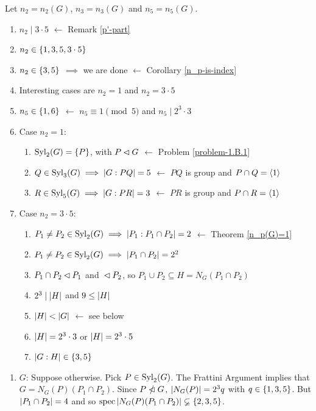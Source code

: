 \begin{solution} Let $n_2=n_2(G)$, $n_3=n_3(G)$ and $n_5=n_5(G)$. 
\begin{enumerate}[1.]
    \item $n_2\mid3\cdot5$ $\leftarrow$ Remark \ref{p'-part}
    \item $n_2\in\{1, 3, 5, 3\cdot5\}$
    \item $n_2\in\{3,5\}$ $\implies$ we are done
        $\leftarrow$ Corollary \ref{n_p-is-index}
    \item Interesting cases are $n_2=1$ and $n_2=3\cdot5$
    \item $n_5\in\{1, 6\}$ $\leftarrow$ $n_5\equiv1\pmod5$ and $n_5\mid 2^3\cdot 3$
    \item Case $n_2=1$:
    \begin{enumerate}[\upshape -]
        \item ${\rm Syl}_2(G)=\{P\}$, with $P\lhd G$
            $\leftarrow$ Problem \ref{problem-1.B.1}
        \item $Q\in{\rm Syl}_3(G)\implies\left\vert{G:PQ}\right\vert=5$
            $\leftarrow$ $PQ$ is group and $P\cap Q=\langle1\rangle$
        \item $R\in{\rm Syl}_5(G)\implies\left\vert{G:PR}\right\vert=3$
            $\leftarrow$ $PR$ is group and $P\cap R=\langle1\rangle$
    \end{enumerate}
    \item Case $n_2=3\cdot5$:
        \begin{enumerate}[\upshape -]
            \item $P_1\ne P_2\in{\rm Syl}_2(G)\implies\left\vert{P_1:P_1\cap P_2}\right\vert= 2$
                $\leftarrow$ Theorem \ref{n_p(G)=1}
            \item $P_1\ne P_2\in{\rm Syl}_2(G)\implies\left\vert{P_1\cap P_2}\right\vert= 2^2$
            \item $P_1\cap P_2\lhd P_1$ and ${}\lhd P_2$,
                so $P_1\cup P_2\subseteq H=N_G(P_1\cap P_2)$
            \item  $2^3\mid\left\vert{H}\right\vert$ and $9\le\left\vert{H}\right\vert$
            \item $\left\vert{H}\right\vert<\left\vert{G}\right\vert$ $\leftarrow$ see below
            \item $\left\vert{H}\right\vert=2^3\cdot3$ or $\left\vert{H}\right\vert=2^3\cdot5$
            \item $\left\vert{G:H}\right\vert\in\{3,5\}$
        \end{enumerate}
\end{enumerate}

\begin{enumerate}
    \item[$H\varsubsetneq$] $G$: Suppose otherwise. Pick $P\in{\rm Syl}_2(G)$. The Frattini Argument implies that $G=N_G(P)(P_1\cap P_2)$. Since $P\nnormal G$, $\left\vert{N_G(P)}\right\vert=2^3q$ with $q\in\{1,3,5\}$. But $\left\vert{P_1\cap P_2}\right\vert=4$ and so $\operatorname{spec}\left\vert{N_G(P)(P_1\cap P_2)}\right\vert\varsubsetneq\{2,3,5\}$.
\end{enumerate}
\end{solution}

